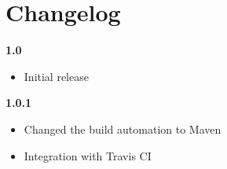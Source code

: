 \chapter{Changelog}

\noindent
\textbf{1.0}
\begin{itemize}
	\renewcommand{\labelitemi}{$\bullet$}
	\item Initial release
\end{itemize}

\noindent
\textbf{1.0.1}
\begin{itemize}
	\renewcommand{\labelitemi}{$\bullet$}
	\item Changed the build automation to Maven
	\item Integration with Travis CI
\end{itemize}






